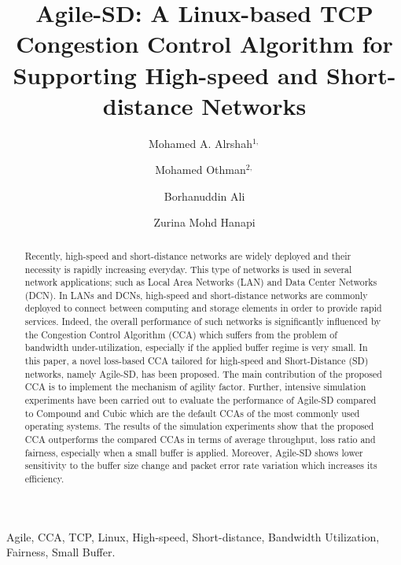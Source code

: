\documentclass[preprint,3p,times,twocolumn,authoryear]{elsarticle}
\begin{document}
\begin{frontmatter}





\title{Agile-SD: A Linux-based TCP Congestion Control Algorithm for Supporting High-speed and Short-distance Networks}




\author[lable1]{Mohamed A. Alrshah$^{1,}$}
\author[lable1]{Mohamed Othman$^{2,}$}
\author[lable2]{Borhanuddin Ali}
\author[lable1]{Zurina Mohd Hanapi}
\address[lable1]{Department of Communication Technology and Network, Universiti Putra Malaysia, 43400 UPM, Serdang, Selangor D.E., Malaysia}
\address[lable2]{Department of Computer and Communication Systems Engineering, Universiti Putra Malaysia, 43400 UPM, Serdang, Selangor D.E, Malaysia.}

\begin{abstract}
Recently, high-speed and short-distance networks are widely deployed and their necessity is rapidly increasing everyday. This type of networks is used in several network applications; such as Local Area Networks (LAN) and Data Center Networks (DCN). In LANs and DCNs, high-speed and short-distance networks are commonly deployed to connect between computing and storage elements in order to provide rapid services. Indeed, the overall performance of such networks is significantly influenced by the Congestion Control Algorithm (CCA) which suffers from the problem of bandwidth under-utilization, especially if the applied buffer regime is very small. In this paper, a novel loss-based CCA tailored for high-speed and Short-Distance (SD) networks, namely Agile-SD, has been proposed. The main contribution of the proposed CCA is to implement the mechanism of agility factor. Further, intensive simulation experiments have been carried out to evaluate the performance of Agile-SD compared to Compound and Cubic which are the default CCAs of the most commonly used operating systems. The results of the simulation experiments show that the proposed CCA outperforms the compared CCAs in terms of average throughput, loss ratio and fairness, especially when a small buffer is applied. Moreover, Agile-SD shows lower sensitivity to the buffer size change and packet error rate variation which increases its efficiency.

\end{abstract}

\begin{keyword}
Agile\sep
CCA\sep
TCP\sep
Linux\sep
High-speed\sep
Short-distance\sep
Bandwidth Utilization\sep
Fairness\sep
Small Buffer.
\end{keyword}

\end{frontmatter}
\end{document}
